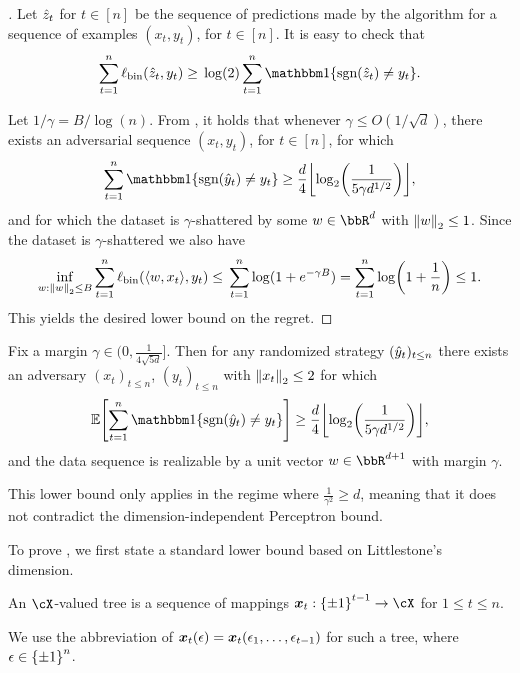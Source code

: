 \begin{proof}[]
Let $\zh_t$ for $t \in [n]$ be the sequence of predictions made by the algorithm for a sequence of examples $(x_t, y_t)$, for $t \in [n]$. It is easy to check that
\begin{align*}
	\sum_{t=1}^{n}\ls_\text{bin}(\zh_t, y_t) \geq{} \log(2)\sum_{t=1}^{n}\ind\crl*{\sgn(\zh_t)\neq{}y_t}.
\end{align*}

Let $1/\gamma=B/\log(n)$. From , it holds that whenever $\gamma\leq{}O(1/\sqrt{d})$, there exists an adversarial sequence $(x_t, y_t)$, for $t \in [n]$, for which 
\[
\sum_{t=1}^{n}\ind\crl*{\sgn(\yh_t)\neq{}y_t}\geq{}\frac{d}{4}\floor*{\log_{2}\prn*{\frac{1}{5\gamma{}d^{1/2}}}},
\]
and for which the dataset is $\gamma$-shattered by some $w\in\bbR^{d}$ with $\nrm*{w}_2\leq{}1$. Since the dataset is $\gamma$-shattered we also have
\[
\inf_{w:\nrm*{w}_2\leq{}B}\sum_{t=1}^{n}\ls_\text{bin}(\tri*{w,x_t}, y_t)\leq{}\sum_{t=1}^{n}\log(1+e^{-\gamma{}B})=\sum_{t=1}^{n}\log\prn*{1+\frac{1}{n}}\leq{}1.
\]
This yields the desired lower bound on the regret.
\end{proof}


\begin{theorem}
\label{thm:margin_lb}
Fix a margin $\gamma\in(0,\frac{1}{4\sqrt{5d}}]$. Then for any randomized strategy $(\yh_t)_{t\leq{}n}$ there exists an adversary $(x_t)_{t\leq{}n}$, $(y_t)_{t\leq{}n}$ with $\nrm*{x_t}_2\leq{}2$ for which
\begin{equation}
\En\brk*{\sum_{t=1}^{n}\ind\crl*{\sgn(\yh_t)\neq{}y_t}} \geq{} \frac{d}{4}\floor*{\log_{2}\prn*{\frac{1}{5\gamma{}d^{1/2}}}},
\end{equation}
and the data sequence is realizable by a unit vector $w\in\bbR^{d+1}$ with margin $\gamma$.
\end{theorem}
\begin{remark}
This lower bound only applies in the regime where $\frac{1}{\gamma^{2}}\geq{}d$, meaning that it does not contradict the dimension-independent Perceptron bound.
\end{remark}
To prove , we first state a standard lower bound based on Littlestone's dimension.

\begin{definition}
An $\cX$-valued tree is a sequence of mappings $\mb{x}_{t}:\pmo^{t-1}\to\cX$ for $1\leq{}t\leq{}n$.
\end{definition}
We use the abbreviation of $\mb{x}_{t}(\eps) = \mb{x}_{t}(\eps_{1},\ldots,\eps_{t-1})$ for such a tree, where $\eps\in\pmo^{n}$.

